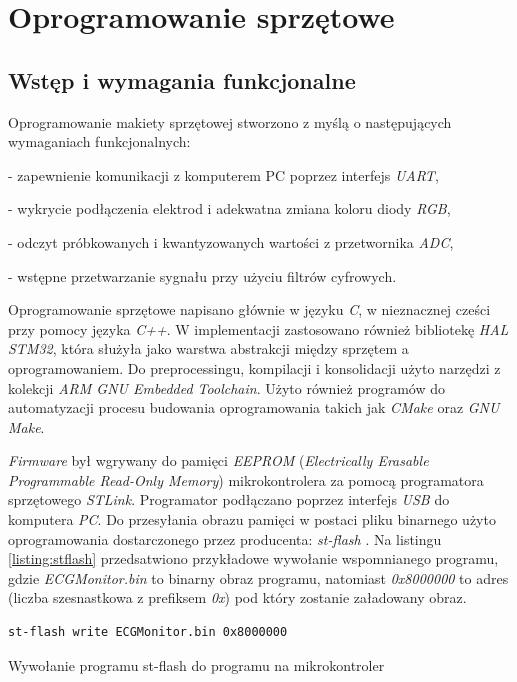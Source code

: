 
\chapter{Oprogramowanie sprzętowe}

\section{Wstęp i wymagania funkcjonalne}
Oprogramowanie makiety sprzętowej stworzono z myślą o następujących wymaganiach funkcjonalnych:

- zapewnienie komunikacji z komputerem PC poprzez interfejs \textit{UART},

- wykrycie podłączenia elektrod i adekwatna zmiana koloru diody \textit{RGB},

- odczyt próbkowanych i kwantyzowanych wartości z przetwornika \textit{ADC},

- wstępne przetwarzanie sygnału przy użyciu filtrów cyfrowych.  

Oprogramowanie sprzętowe napisano głównie w języku \textit{C}, w nieznacznej cześci przy 
pomocy języka \textit{C++}. W implementacji zastosowano również bibliotekę \textit{HAL STM32},
która służyła jako warstwa abstrakcji między sprzętem a oprogramowaniem. Do preprocessingu, 
kompilacji i konsolidacji użyto narzędzi z kolekcji \textit{ARM GNU Embedded Toolchain}. 
Użyto również programów do automatyzacji procesu
budowania oprogramowania takich jak \textit{CMake} oraz \textit{GNU Make}.

\textit{Firmware} był wgrywany do pamięci \textit{EEPROM} 
(\textit{Electrically Erasable Programmable Read-Only Memory}) mikrokontrolera za pomocą
programatora sprzętowego \textit{STLink}.
Programator podłączano poprzez interfejs \textit{USB} do komputera \textit{PC}.
Do przesyłania obrazu pamięci w postaci
pliku binarnego użyto oprogramowania dostarczonego przez producenta: \textit{st-flash} 
\cite{stflash}. Na listingu \ref{listing:stflash} przedsatwiono przykładowe wywołanie wspomnianego
programu, gdzie \textit{ECGMonitor.bin} to binarny obraz programu, natomiast \textit{0x8000000} to
adres (liczba szesnastkowa z prefiksem \textit{0x}) 
pod który zostanie załadowany obraz.

\begin{listing}
\begin{verbatim}
st-flash write ECGMonitor.bin 0x8000000
\end{verbatim}
\caption{Wywołanie programu st-flash do  programu na mikrokontroler}
\label{listing:stflash}
\end{listing}

